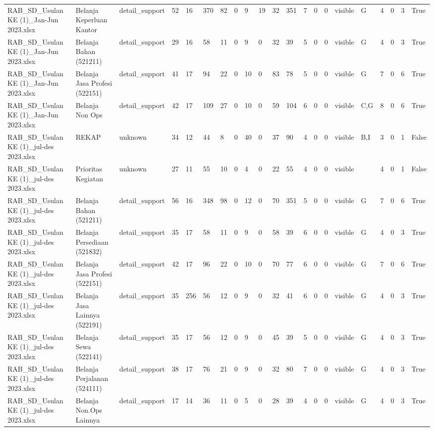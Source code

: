 \begin{longtable}{lllllllllllllllllllll}
RAB\_SD\_Usulan KE (1)\_Jan-Jun 2023.xlsx & Belanja Keperluan Kantor & detail\_support & 52 & 16 & 370 & 82 & 0 & 9 & 19 & 32 & 351 & 7 & 0 & 0 & visible & G & 4 & 0 & 3 & True \\
RAB\_SD\_Usulan KE (1)\_Jan-Jun 2023.xlsx & Belanja Bahan (521211) & detail\_support & 29 & 16 & 58 & 11 & 0 & 9 & 0 & 32 & 39 & 5 & 0 & 0 & visible & G & 4 & 0 & 3 & True \\
RAB\_SD\_Usulan KE (1)\_Jan-Jun 2023.xlsx & Belanja Jasa Profesi (522151) & detail\_support & 41 & 17 & 94 & 22 & 0 & 10 & 0 & 83 & 78 & 5 & 0 & 0 & visible & G & 7 & 0 & 6 & True \\
RAB\_SD\_Usulan KE (1)\_Jan-Jun 2023.xlsx & Belanja Non Ops & detail\_support & 42 & 17 & 109 & 27 & 0 & 10 & 0 & 59 & 104 & 6 & 0 & 0 & visible & C,G & 8 & 0 & 6 & True \\
RAB\_SD\_Usulan KE (1)\_jul-des 2023.xlsx & REKAP & unknown & 34 & 12 & 44 & 8 & 0 & 40 & 0 & 37 & 90 & 4 & 0 & 0 & visible & B,I & 3 & 0 & 1 & False \\
RAB\_SD\_Usulan KE (1)\_jul-des 2023.xlsx & Prioritas Kegiatan & unknown & 27 & 11 & 55 & 10 & 0 & 4 & 0 & 22 & 55 & 4 & 0 & 0 & visible &  & 4 & 0 & 1 & False \\
RAB\_SD\_Usulan KE (1)\_jul-des 2023.xlsx & Belanja Bahan (521211) & detail\_support & 56 & 16 & 348 & 98 & 0 & 12 & 0 & 70 & 351 & 5 & 0 & 0 & visible & G & 7 & 0 & 6 & True \\
RAB\_SD\_Usulan KE (1)\_jul-des 2023.xlsx & Belanja Persediaan (521832) & detail\_support & 35 & 17 & 58 & 11 & 0 & 9 & 0 & 58 & 39 & 6 & 0 & 0 & visible & G & 4 & 0 & 3 & True \\
RAB\_SD\_Usulan KE (1)\_jul-des 2023.xlsx & Belanja Jasa Profesi (522151) & detail\_support & 42 & 17 & 96 & 22 & 0 & 10 & 0 & 70 & 77 & 6 & 0 & 0 & visible & G & 7 & 0 & 6 & True \\
RAB\_SD\_Usulan KE (1)\_jul-des 2023.xlsx & Belanja Jasa Lainnya (522191) & detail\_support & 35 & 256 & 56 & 12 & 0 & 9 & 0 & 32 & 41 & 6 & 0 & 0 & visible & G & 4 & 0 & 3 & True \\
RAB\_SD\_Usulan KE (1)\_jul-des 2023.xlsx & Belanja Sewa (522141) & detail\_support & 35 & 17 & 56 & 12 & 0 & 9 & 0 & 45 & 39 & 5 & 0 & 0 & visible & G & 4 & 0 & 3 & True \\
RAB\_SD\_Usulan KE (1)\_jul-des 2023.xlsx & Belanja Perjalanan (524111) & detail\_support & 38 & 17 & 76 & 21 & 0 & 9 & 0 & 32 & 80 & 7 & 0 & 0 & visible & G & 4 & 0 & 3 & True \\
RAB\_SD\_Usulan KE (1)\_jul-des 2023.xlsx & Belanja Non.Ops Lainnya & detail\_support & 17 & 14 & 36 & 11 & 0 & 5 & 0 & 28 & 39 & 4 & 0 & 0 & visible & G & 4 & 0 & 3 & True \\
\end{longtable}
\endgroup
